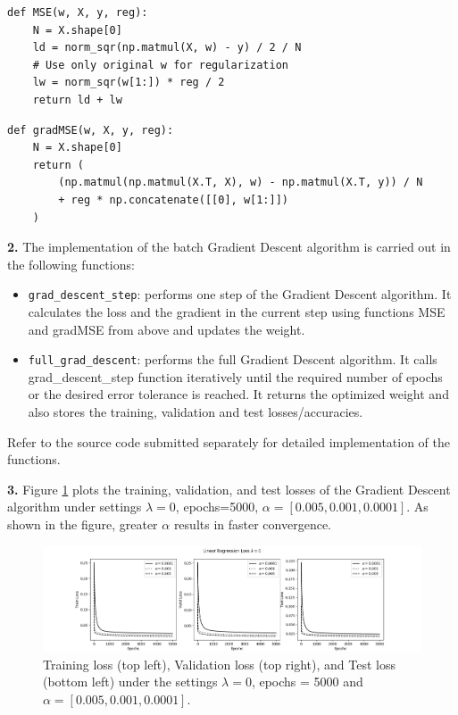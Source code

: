 \documentclass[12pt]{article}
\newenvironment{problem}[2][Problem]{\begin{trivlist}
\item[\hskip \labelsep {\bfseries #1}\hskip \labelsep {\bfseries #2.}]}{\end{trivlist}}
\begin{document}
\begin{problem}{1}
\begin{lstlisting}[frame=single]
def MSE(w, X, y, reg):
    N = X.shape[0]
    ld = norm_sqr(np.matmul(X, w) - y) / 2 / N
    # Use only original w for regularization
    lw = norm_sqr(w[1:]) * reg / 2
    return ld + lw
\end{lstlisting}

\begin{lstlisting}[frame=single]
def gradMSE(w, X, y, reg):
    N = X.shape[0]
    return (
        (np.matmul(np.matmul(X.T, X), w) - np.matmul(X.T, y)) / N
        + reg * np.concatenate([[0], w[1:]])
    )
\end{lstlisting}

\bigskip

\textbf{2.} The implementation of the batch Gradient Descent algorithm is carried out in the following functions:
\begin{itemize}
    \item \texttt{grad\_descent\_step}: performs one step of the Gradient Descent algorithm. It calculates the loss and the gradient in the current step using functions MSE and gradMSE from above and updates the weight. 
    \item \texttt{full\_grad\_descent}: performs the full Gradient Descent algorithm. It calls grad\_descent\_step function iteratively until the required number of epochs or the desired error tolerance is reached. It returns the optimized weight and also stores the training, validation and test losses/accuracies.   
\end{itemize}
    Refer to the source code submitted separately for detailed implementation of the functions.


\bigskip

\textbf{3.} Figure \ref{fig:1-3} plots the training, validation, and test losses of the Gradient Descent algorithm under settings $\lambda=0$, epochs=5000, $\alpha=[0.005, 0.001, 0.0001]$. As shown in the figure,  greater $\alpha$ results in faster convergence. 
\begin{figure}[!htb]
\hspace*{-2cm}
\includegraphics[width=1.2\linewidth]{images/a1/1.3/loss_all.png}
\caption{Training loss (top left), Validation loss (top right), and Test loss (bottom left) under the settings  $\lambda=0$, epochs = 5000 and $\alpha=[0.005, 0.001, 0.0001]$.}\label{fig:1-3}
\end{figure}



\end{problem}
\end{document}
